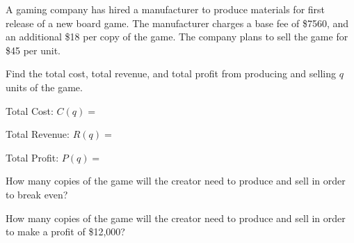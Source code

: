 \documentclass[11pt]{exam}
\begin{document}
\addpoints

\noindent
\begin{center}
\gradetable[v][pages]  %
\end{center}


\newpage %

%
%
%

\begin{questions}

\newpage
\addpoints

\question[5] A gaming company has hired a manufacturer to produce materials for first release of a new board game.  The manufacturer charges a base fee of \$7560, and an additional \$18 per copy of the game.  The company plans to sell the game for \$45 per unit.
\begin{compactenum}[(a)]
\item Find the total cost, total revenue, and total profit from producing and selling $q$ units of the game.
\vspace{1cm}

\p Total Cost: $C(q)=$
\vspace{1.5cm}

\p Total Revenue: $R(q)=$
\vspace{1.5cm}

\p Total Profit: $P(q)=$
\vspace{1.5cm}

\item How many copies of the game will the creator need to produce and sell in order to break even?
\vspace{6cm}

\item How many copies of the game will the creator need to produce and sell in order to make a profit of \$12,000?
\vspace{4cm}

\end{compactenum}
\newpage


\end{questions}
\end{document}
